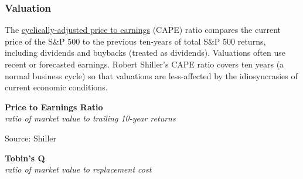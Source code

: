 \documentclass{report}
\makeatletter
\newcommand{\tbllink}[1]{\href{https://raw.githubusercontent.com/bdecon/US-chartbook/master/chartbook/data/#1}{\faTable}}
\newcommand*\short[1]{\expandafter\@gobbletwo\number\numexpr#1\relax}
\newcommand{\shdateaxisticks}{
		date coordinates in=x, axis line style={draw=none},
		xmax={2024-01-31},
		max space between ticks=40,	    
		xtick={{1990-01-01}, {1995-01-01}, {2000-01-01}, 
			{2005-01-01}, {2010-01-01}, {2015-01-01}, {2020-01-01}},
		minor xtick={},
		enlarge y limits={0.06}, enlarge x limits={0.01},
		xticklabel style={align=center, yshift=-2pt}, tick label style={inner sep=0pt},
		}
\newcommand{\bbar}[2]{extra #1 ticks = {{#2}}, extra #1 tick labels = ,
		extra #1 tick style = {grid=major, grid style={thick, black!25}},}
\newcommand{\stdline}[4]{\addplot[very thick, no markers, color=#1] 
		table [x=#2, y=#3, col sep=comma] {#4};	}
\newcommand{\rbars}{
		\fill[color=black!10] (axis cs:{1990-07-01},\pgfkeysvalueof{/pgfplots/ymin})
			rectangle (axis cs:{1991-03-01}, \pgfkeysvalueof{/pgfplots/ymax});
		\fill[color=black!10] (axis cs:{2007-12-01},\pgfkeysvalueof{/pgfplots/ymin})
			rectangle (axis cs:{2009-07-01}, \pgfkeysvalueof{/pgfplots/ymax});
		\fill[color=black!10] (axis cs:{2001-03-01},\pgfkeysvalueof{/pgfplots/ymin})
			rectangle (axis cs:{2001-11-01}, \pgfkeysvalueof{/pgfplots/ymax});
		\fill[color=black!10] (axis cs:{2020-02-01},\pgfkeysvalueof{/pgfplots/ymin})
			rectangle (axis cs:{2020-05-01}, \pgfkeysvalueof{/pgfplots/ymax});}
\makeatother
\begin{document}
{\begin{minipage}{1.0\textwidth}
\subsubsection*{Valuation}
\small The \href{http://www.econ.yale.edu/~shiller/data.htm}{cyclically-adjusted price to earnings} (CAPE) ratio compares the current price of the S\&P 500 to the previous ten-years of total S\&P 500 returns, including dividends and buybacks (treated as dividends). Valuations often use recent or forecasted earnings. Robert Shiller's CAPE ratio covers ten years (a normal business cycle) so that valuations are less-affected by the idiosyncrasies of current economic conditions. 


\end{minipage}
\vspace*{-1mm}

\begin{minipage}{0.37\textwidth}
\normalsize \textbf{Price to Earnings Ratio}\\
\footnotesize{\textit{ratio of market value to trailing 10-year returns}}
\vspace{2.9cm}

\hspace{3mm} 

\footnotesize{Source: Shiller} \hfill \tbllink{catrpe.csv} \ \ \ \ \ \ \ 
\end{minipage} \hspace{3mm} \begin{minipage}{0.38\textwidth} 
\normalsize \textbf{Tobin's Q}\\
\footnotesize{\textit{ratio of market value to replacement cost}}
\vspace{2.9cm}

\hspace{4mm} 


\end{minipage}}
\end{document}
